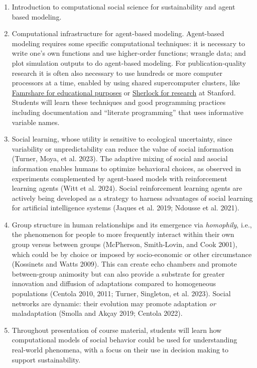 \documentclass[
  letterpaper,
  DIV=11,
  numbers=noendperiod]{scrartcl}
\providecommand{\tightlist}{%
  \setlength{\itemsep}{0pt}\setlength{\parskip}{0pt}}\usepackage{longtable,booktabs,array}
\begin{document}
\begin{enumerate}
\def\labelenumi{\arabic{enumi}.}
\tightlist
\item
  Introduction to computational social science for sustainability and
  agent based modeling.
\item
  Computational infrastructure for agent-based modeling. Agent-based
  modeling requires some specific computational techniques: it is
  necessary to write one's own functions and use higher-order functions;
  wrangle data; and plot simulation outputs to do agent-based modeling.
  For publication-quality research it is often also necessary to use
  hundreds or more computer processors at a time, enabled by using
  shared supercomputer clusters, like
  \href{https://srcc.stanford.edu/farmshare}{Famrshare for educational
  purposes} or \href{https://www.sherlock.stanford.edu/}{Sherlock for
  research} at Stanford. Students will learn these techniques and good
  programming practices including documentation and ``literate
  programming'' that uses informative variable names.
\item
  Social learning, whose utility is sensitive to ecological uncertainty,
  since variability or unpredictability can reduce the value of social
  information (Turner, Moya, et al. 2023). The adaptive mixing of social
  and asocial information enables humans to optimize behavioral choices,
  as observed in experiments complemented by agent-based models with
  reinforcement learning agents (Witt et al. 2024). Social reinforcement
  learning agents are actively being developed as a strategy to harness
  advantages of social learning for artificial intelligence systems
  (Jaques et al. 2019; Ndousse et al. 2021).
\item
  Group structure in human relationships and its emergence via
  \emph{homophily}, i.e., the phenomenon for people to more frequently
  interact within their own group versus between groups (McPherson,
  Smith-Lovin, and Cook 2001), which could be by choice or imposed by
  socio-economic or other circumstance (Kossinets and Watts 2009). This
  can create echo chambers and promote between-group animosity but can
  also provide a substrate for greater innovation and diffusion of
  adaptations compared to homogeneous populations (Centola 2010, 2011;
  Turner, Singleton, et al. 2023). Social networks are dynamic: their
  evolution may promote adaptation \emph{or} maladaptation (Smolla and
  Akçay 2019; Centola 2022).
\item
  Throughout presentation of course material, students will learn how
  computational models of social behavior could be used for
  understanding real-world phenomena, with a focus on their use in
  decision making to support sustainability.
\end{enumerate}
\end{document}

